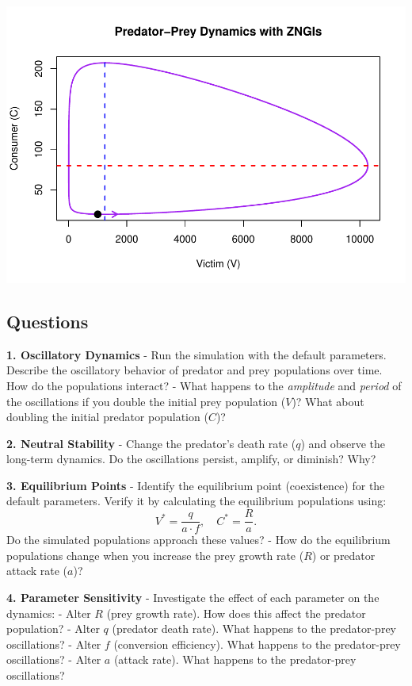 \documentclass[
  a4paper]{book}
\begin{document}
\includegraphics{BB512_files/figure-latex/phase-plot-1.pdf}

\subsection{Questions}\label{questions-11}

\textbf{1. Oscillatory Dynamics}
- Run the simulation with the default parameters. Describe the oscillatory behavior of predator and prey populations over time. How do the populations interact?
- What happens to the \emph{amplitude} and \emph{period} of the oscillations if you double the initial prey population (\(V\))? What about doubling the initial predator population (\(C\))?

\textbf{2. Neutral Stability}
- Change the predator's death rate (\(q\)) and observe the long-term dynamics. Do the oscillations persist, amplify, or diminish? Why?

\textbf{3. Equilibrium Points}
- Identify the equilibrium point (coexistence) for the default parameters. Verify it by calculating the equilibrium populations using:
\[
  V^* = \frac{q}{a \cdot f}, \quad C^* = \frac{R}{a}.
  \]
Do the simulated populations approach these values?
- How do the equilibrium populations change when you increase the prey growth rate (\(R\)) or predator attack rate (\(a\))?

\textbf{4. Parameter Sensitivity}
- Investigate the effect of each parameter on the dynamics:
- Alter \(R\) (prey growth rate). How does this affect the predator population?
- Alter \(q\) (predator death rate). What happens to the predator-prey oscillations?
- Alter \(f\) (conversion efficiency). What happens to the predator-prey oscillations?
- Alter \(a\) (attack rate). What happens to the predator-prey oscillations?
\end{document}
